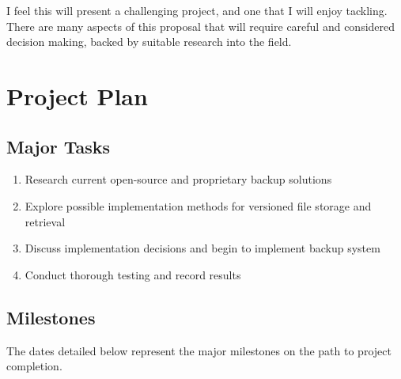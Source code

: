 \documentclass[a4paper]{article}
\begin{document}
    I feel this will present a challenging project, and one that I will enjoy
    tackling. There are many aspects of this proposal that will require careful
    and considered decision making, backed by suitable research into the field.

    \section{Project Plan}

    \subsection{Major Tasks}

    \begin{enumerate}
        \item Research current open-source and proprietary backup solutions
        \item Explore possible implementation methods for versioned file
            storage and retrieval
        \item Discuss implementation decisions and begin to implement backup
            system
        \item Conduct thorough testing and record results
    \end{enumerate}

    \subsection{Milestones}

    The dates detailed below represent the major milestones on the path to
    project completion.
\end{document}
